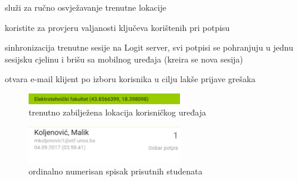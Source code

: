 \begin{description}[noitemsep,align=right,labelwidth=2cm]
    \item [Dugme 1] služi za ručno osvježavanje trenutne lokacije
    \item [Dugme 2] koristite za provjeru valjanosti ključeva korištenih pri potpisu
    \item [Dugme 3] sinhronizacija trenutne sesije na Logit server, svi potpisi se pohranjuju u jednu sesijsku cjelinu i brišu sa mobilnog uređaja (kreira se nova sesija)
    \item [Dugme 4] otvara e-mail klijent po izboru korisnika u cilju lakše prijave grešaka
\end{description}

\begin{figure}[H]
    \centering
    \includegraphics[width=0.6\textwidth]{material/manual/03-geobar}
    \caption{trenutno zabilježena lokacija korisničkog uređaja}
\end{figure}

\begin{figure}[H]
    \centering
    \includegraphics[width=0.6\textwidth]{material/manual/04-attns}
    \caption{ordinalno numerisan spisak prisutnih studenata}
\end{figure}